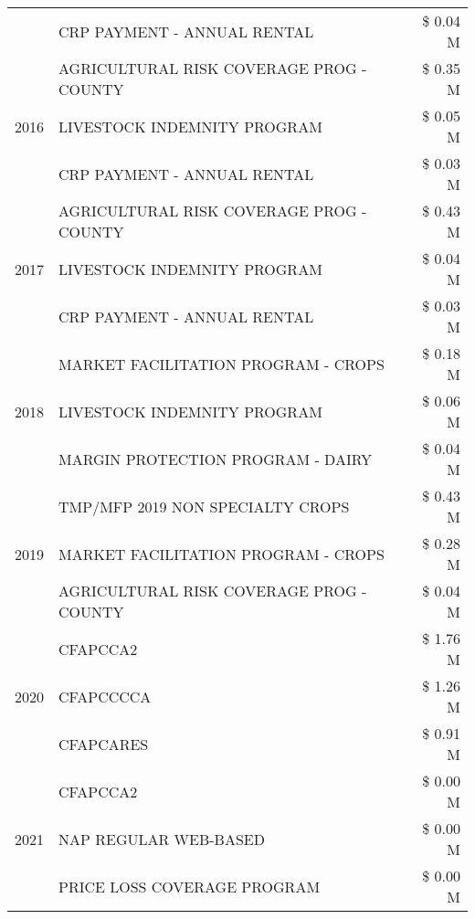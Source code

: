 \begin{tabular}{llr}
 & CRP PAYMENT - ANNUAL RENTAL & \$ 0.04 M \\
\cline{1-3}
\multirow[t]{3}{*}{2016} & AGRICULTURAL RISK COVERAGE PROG - COUNTY & \$ 0.35 M \\
 & LIVESTOCK INDEMNITY PROGRAM & \$ 0.05 M \\
 & CRP PAYMENT - ANNUAL RENTAL & \$ 0.03 M \\
\cline{1-3}
\multirow[t]{3}{*}{2017} & AGRICULTURAL RISK COVERAGE PROG - COUNTY & \$ 0.43 M \\
 & LIVESTOCK INDEMNITY PROGRAM & \$ 0.04 M \\
 & CRP PAYMENT - ANNUAL RENTAL & \$ 0.03 M \\
\cline{1-3}
\multirow[t]{3}{*}{2018} & MARKET FACILITATION PROGRAM - CROPS & \$ 0.18 M \\
 & LIVESTOCK INDEMNITY PROGRAM & \$ 0.06 M \\
 & MARGIN PROTECTION PROGRAM - DAIRY & \$ 0.04 M \\
\cline{1-3}
\multirow[t]{3}{*}{2019} & TMP/MFP 2019 NON SPECIALTY CROPS & \$ 0.43 M \\
 & MARKET FACILITATION PROGRAM - CROPS & \$ 0.28 M \\
 & AGRICULTURAL RISK COVERAGE PROG - COUNTY & \$ 0.04 M \\
\cline{1-3}
\multirow[t]{3}{*}{2020} & CFAPCCA2 & \$ 1.76 M \\
 & CFAPCCCCA & \$ 1.26 M \\
 & CFAPCARES & \$ 0.91 M \\
\cline{1-3}
\multirow[t]{3}{*}{2021} & CFAPCCA2 & \$ 0.00 M \\
 & NAP REGULAR WEB-BASED & \$ 0.00 M \\
 & PRICE LOSS COVERAGE PROGRAM & \$ 0.00 M \\
\cline{1-3}
\bottomrule
\end{tabular}
